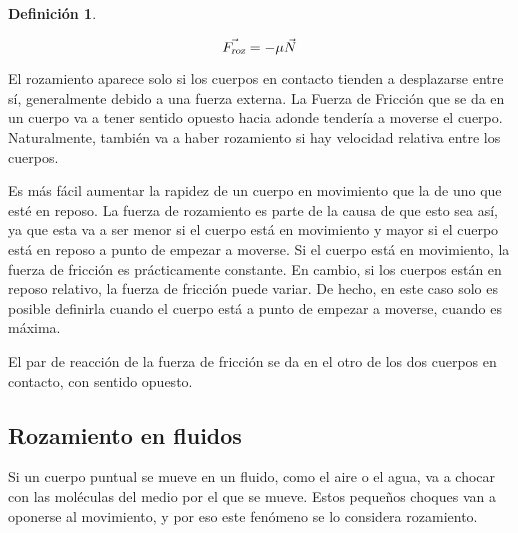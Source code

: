 \documentclass[a5paper,12pt,twoside]{book}
\newtheorem{defn}{{Definición}}[chapter]
\begin{document}
\begin{mdframed}[style=MyFrame1]
    \begin{defn}
    \end{defn}
    \begin{equation*}
        \Vec{{{F}_\textsl{{roz}}}} = - \mu \Vec{N}
    \end{equation*}
\end{mdframed}

El rozamiento aparece solo si los cuerpos en contacto tienden a desplazarse entre sí, generalmente debido a una fuerza externa. La Fuerza de Fricción que se da en un cuerpo va a tener sentido opuesto hacia adonde tendería a moverse el cuerpo. Naturalmente, también va a haber rozamiento si hay velocidad relativa entre los cuerpos.

\begin{center}
    \def\svgwidth{0.7\linewidth}
    
\end{center}

Es más fácil aumentar la rapidez de un cuerpo en movimiento que la de uno que esté en reposo. La fuerza de rozamiento es parte de la causa de que esto sea así, ya que esta va a ser menor si el cuerpo está en movimiento y mayor si el cuerpo está en reposo a punto de empezar a moverse. Si el cuerpo está en movimiento, la fuerza de fricción es prácticamente constante. En cambio, si los cuerpos están en reposo relativo, la fuerza de fricción puede variar. De hecho, en este caso solo es posible definirla cuando el cuerpo está a punto de empezar a moverse, cuando es máxima.

\begin{center}
    \def\svgwidth{0.7\linewidth}
    
\end{center}

El par de reacción de la fuerza de fricción se da en el otro de los dos cuerpos en contacto, con sentido opuesto.

\begin{center}
    \def\svgwidth{0.7\linewidth}
    
\end{center}


\subsection{Rozamiento en fluidos}

Si un cuerpo puntual se mueve en un fluido, como el aire o el agua, va a chocar con las moléculas del medio por el que se mueve. Estos pequeños choques van a oponerse al movimiento, y por eso este fenómeno se lo considera rozamiento.
\end{document}
